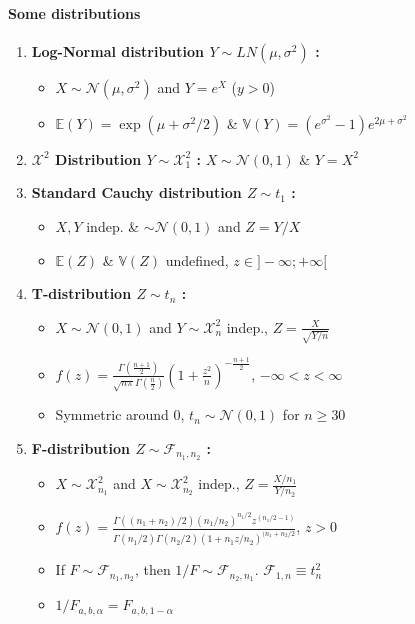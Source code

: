 \documentclass[paper=a4,fontsize=8pt,pagesize,DIV=calc]{scrartcl}
\begin{document}
\begin{multicols}{3}
\paragraph{Some distributions}
\begin{enumerate}
\item \textbf{Log-Normal distribution $Y \sim LN(\mu,\sigma^2)$ :}
\begin{itemize}
\item $X \sim \mathcal{N}(\mu,\sigma^2)$ and $Y=e^X $ ($y>0$)
\item $\mathbb{E}(Y)=\exp(\mu+\sigma^2/2)$ \& $\mathbb{V}(Y)=(e^{\sigma^2}-1)e^{2\mu+\sigma^2}$
\end{itemize}
\item \textbf{$\mathcal{X}^2$ Distribution $Y \sim \mathcal{X}^2_1$ :} $X \sim \mathcal{N}(0,1)$ \& $Y=X^2$ 
\item \textbf{Standard Cauchy distribution $Z\sim t_1$ :}
\begin{itemize}
\item $X,Y$ indep. \& $\sim \mathcal{N}(0,1)$ and $Z=Y/X$ 
\item $\mathbb{E}(Z)$ \& $\mathbb{V}(Z)$ undefined, $z\in ]-\infty; +\infty[$
\end{itemize}
\item \textbf{T-distribution $Z \sim t_n$ :}
\begin{itemize}
\item $X \sim \mathcal{N}(0,1)$ and $Y \sim \mathcal{X}^2_n$ indep., $Z=\frac{X}{\sqrt{Y/n}}$
\item $f(z)=\frac{\Gamma \left( \frac{n+1}{2}\right)}{\sqrt{n\pi}\Gamma \left( \frac{n}{2}\right)} \left(1+\frac{z^2}{n} \right)^{-\frac{n+1}{2}}$, $-\infty<z<\infty$
\item Symmetric around 0, $t_n\sim \mathcal{N}(0,1)$ for $n\geq 30 $
\end{itemize}
\item \textbf{F-distribution $Z\sim \mathcal{F}_{n_1,n_2}$ :}
\begin{itemize}
\item $X \sim \mathcal{X}^2_{n_1}$ and $X \sim \mathcal{X}^2_{n_2}$ indep., $Z=\frac{X/n_1}{Y/n_2}$
\item $f(z)=\frac{\Gamma((n_1+n_2)/2)(n_1/n_2)^{n_1/2}z^{(n_1/2-1)}}{\Gamma(n_1/2)\Gamma(n_2/2)(1+n_1z/n_2)^{(n_1+n_2/2}}$, $z>0$
\item If $F \sim \mathcal{F}_{n_1,n_2}$, then $1/F\sim \mathcal{F}_{n_2,n_1}$. $\mathcal{F}_{1,n}\equiv t^2_n$
\item $1/F_{a,b,\alpha}=F_{a,b,1-\alpha}$
\end{itemize}
\end{enumerate}

\end{multicols}
\end{document}
